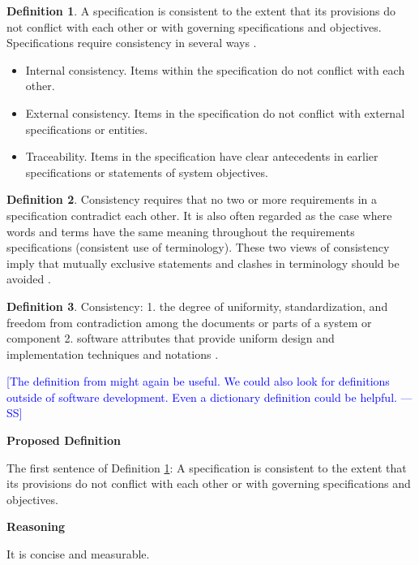 \documentclass[letterpaper,cleveref]{lipics-v2019}
\newcommand{\authornote}[3]{\textcolor{#1}{[#3 ---#2]}}
\newcommand{\authornote}[3]{}
\newcommand{\wss}[1]{\authornote{blue}{SS}{#1}} %
\theoremstyle{definition}
\newtheorem{defn}{Definition}
\begin{document}
\begin{defn}
  \label{ConsistencySelected}
  A specification is consistent to the extent that its provisions do not
  conflict with each other or with governing specifications and
  objectives. Specifications require consistency in several ways
  \citep{Boehm1984}.
  \begin{itemize}
  \item Internal consistency. Items within the specification do not conflict
    with each other.
  \item External consistency. Items in the specification do not conflict with
    external specifications or entities.
  \item Traceability. Items in the specification have clear antecedents in
    earlier specifications or statements of system objectives.
  \end{itemize}
\end{defn}

\begin{defn}
  Consistency requires that no two or more requirements in a specification
  contradict each other. It is also often regarded as the case where words and
  terms have the same meaning throughout the requirements specifications
  (consistent use of terminology). These two views of consistency imply that
  mutually exclusive statements and clashes in terminology should be avoided
  \citep{ZOWGHI2003}.
\end{defn}
\begin{defn}
  Consistency: 1. the degree of uniformity, standardization, and freedom from
  contradiction among the documents or parts of a system or component
  2. software attributes that provide uniform design and implementation
  techniques and notations \citep{ISO/IEC/IEEE24765}.
\end{defn}

\wss{The definition from \citet{IEEE1998} might again be useful.  We could also
  look for definitions outside of software development.  Even a dictionary
  definition could be helpful.}

\noindent \textbf{Proposed Definition} 

The first sentence of Definition \ref{ConsistencySelected}: A specification is
consistent to the extent that its provisions do not conflict with each other or
with governing specifications and objectives.

\noindent \textbf{Reasoning}

It is concise and measurable.
\end{document}
